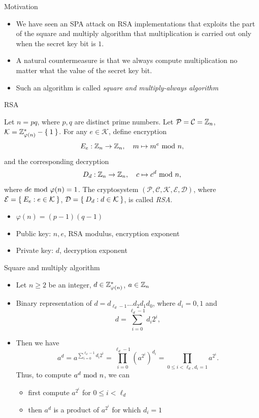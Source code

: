 \begin{frame}{Motivation}
    \begin{itemize}
        \item We have seen an SPA attack on RSA implementations that exploits the part of the square and multiply algorithm that multiplication is carried out only when the secret key bit is $1$.
      \item A natural countermeasure is that we always compute multiplication no matter what the value of the secret key bit.
      \item Such an algorithm is called \textit{square and multiply-always algorithm}
    \end{itemize}
\end{frame}

\begin{frame}{RSA}
\begin{definition}[RSA]
Let $n=pq$, where $p,q$ are distinct prime numbers.
Let $\mathcal{P}=\mathcal{C}={\mathbb Z}_n$, $\mathcal{K}={\mathbb Z}_{\varphi(n)}^*-\Set{1}$.
For any $e\in \mathcal{K}$, define encryption
\[
    E_e:{\mathbb Z}_n\to{\mathbb Z}_n,\quad m\mapsto m^e\textrm{~mod~} n,
\]
and the corresponding decryption
\[
    D_d:{\mathbb Z}_n\to{\mathbb Z}_n,\quad c\mapsto c^d\textrm{~mod~} n,
\]
where $de\textrm{~mod~}\varphi(n)=1$.
The cryptosystem $(\mathcal{P},\mathcal{C},\mathcal{K},\mathcal{E},\mathcal{D})$, where $\mathcal{E}=\Set{E_e:e\in\mathcal{K}}$, $\mathcal{D}=\Set{D_d:d\in\mathcal{K}}$, is called \textit{RSA}.
\end{definition}
\begin{itemize}
    \item $\varphi(n)=(p-1)(q-1)$
    \item Public key: $n,e$, RSA modulus, encryption exponent
    \item Private key: $d$, decryption exponent
\end{itemize}
\end{frame}

\begin{frame}{Square and multiply algorithm}
    \begin{itemize}
        \item Let $n\geq2$ be an integer, $d\in{\mathbb Z}_{\varphi(n)}^{*}$, $a\in{\mathbb Z}_n$
        \item Binary representation of $d=d_{\ell_d-1}\dots d_2d_1d_0$, where $d_i=0,1$ and
\[
d=\sum_{i=0}^{\ell_d-1}d_i2^i,
\]
\item Then we have
\[
a^d=a^{\sum_{i=0}^{\ell_d-1}d_i2^i}=\prod_{i=0}^{\ell_d-1}(a^{2^i})^{d_i}=\prod_{0\leq i<\ell_d,d_i=1}a^{2^i}.
\]
Thus, to compute $a^d\textrm{~mod~} n$, we can 
\begin{itemize}
    \item first compute $a^{2^i}$ for $0\leq i<\ell_d$
    \item then $a^d$ is a product of $a^{2^i}$ for which $d_i=1$
\end{itemize}
    \end{itemize}
\end{frame}

